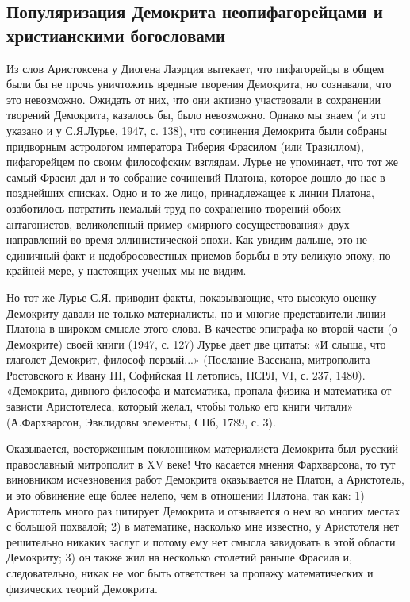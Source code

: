 \subsection{Популяризация  Демокрита неопифагорейцами  и христианскими
богословами}

Из  слов Аристоксена  у Диогена  Лаэрция вытекает,  что пифагорейцы  в
общем  были бы  не  прочь уничтожить  вредные  творения Демокрита,  но
сознавали,  что  это  невозможно.  Ожидать от  них,  что  они  активно
участвовали  в  сохранении  творений   Демокрита,  казалось  бы,  было
невозможно. Однако  мы знаем (и  это указано  и у С.Я.Лурье,  1947, с.
138),  что  сочинения  Демокрита были  собраны  придворным  астрологом
императора  Тиберия Фрасилом  (или Тразиллом),  пифагорейцем по  своим
философским взглядам. Лурье не упоминает,  что тот же самый Фрасил дал
и то  собрание сочинений  Платона, которое дошло  до нас  в позднейших
списках. Одно и то же лицо, принадлежащее к линии Платона, озаботилось
потратить  немалый труд  по  сохранению  творений обоих  антагонистов,
великолепный  пример  «мирного  сосуществования» двух  направлений  во
время эллинистической эпохи. Как увидим  дальше, это не единичный факт
и  недобросовестных приемов  борьбы в  эту великую  эпоху, по  крайней
мере, у настоящих ученых мы не видим.

Но тот же Лурье С.Я.  приводит факты, показывающие, что высокую оценку
Демокриту  давали не  только материалисты,  но и  многие представители
линии Платона  в широком  смысле этого слова.  В качестве  эпиграфа ко
второй части (о  Демокрите) своей книги (1947, с. 127)  Лурье дает две
цитаты: «И слыша, что  глаголет Демокрит, философ первый...» (Послание
Вассиана, митрополита Ростовского к  Ивану III, Софийская II летопись,
ПСРЛ, VI,  с. 237, 1480).  «Демокрита, дивного философа  и математика,
пропала физика  и математика  от зависти Аристотелеса,  который желал,
чтобы только его книги читали» (А.Фархварсон, Эвклидовы элементы, СПб,
1789, с. 3).

Оказывается,  восторженным  поклонником   материалиста  Демокрита  был
русский  православный  митрополит  в  XV  веке!  Что  касается  мнения
Фархварсона,   то   тут   виновником  исчезновения   работ   Демокрита
оказывается не Платон, а Аристотель, и это обвинение еще более нелепо,
чем в  отношении Платона,  так как: 1)  Аристотель много  раз цитирует
Демокрита и отзывается о нем во многих местах с большой похвалой; 2) в
математике,  насколько  мне  известно,  у  Аристотеля  нет  решительно
никаких  заслуг и  потому ему  нет  смысла завидовать  в этой  области
Демокриту; 3)  он также  жил на несколько  столетий раньше  Фрасила и,
следовательно, никак не мог  быть ответствен за пропажу математических
и физических теорий Демокрита.

